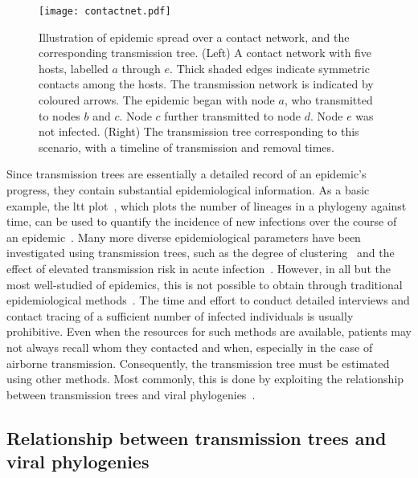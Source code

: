 \begin{figure}
    \centering
    \texttt{[image: contactnet.pdf]}
    \caption[Illustration of a contact network and transmission tree]{
      Illustration of epidemic spread over a contact network, and the
      corresponding transmission tree. (Left) A contact network with five
      hosts, labelled $a$ through $e$. Thick shaded edges indicate symmetric
      contacts among the hosts. The transmission network is indicated by
      coloured arrows. The epidemic began with node $a$, who transmitted to
      nodes $b$ and $c$. Node $c$ further transmitted to node $d$. Node $e$ was
      not infected. (Right) The transmission tree corresponding to this
      scenario, with a timeline of transmission and removal times.
    }
    \label{fig:contactnet}
\end{figure}

Since transmission trees are essentially a detailed record of an epidemic's
progress, they contain substantial epidemiological information. As a basic
example, the \gls{ltt} plot~\autocite{nee1992tempo}, which plots the number of
lineages in a phylogeny against time, can be used to quantify the incidence of
new infections over the course of an epidemic~\autocite{holmes1995revealing}.
Many more diverse epidemiological parameters have been investigated using
transmission trees, such as the degree of
clustering~\autocite{hughes2009molecular} and the effect of elevated
transmission risk in acute infection~\autocite{volz2012simple}. However, in all
but the most well-studied of epidemics, this is not possible to obtain through
traditional epidemiological methods~\autocite{welch2011statistical}. The time
and effort to conduct detailed interviews and contact tracing of a sufficient
number of infected individuals is usually prohibitive. Even when the resources
for such methods are available, patients may not always recall whom they
contacted and when, especially in the case of airborne transmission.
Consequently, the transmission tree must be estimated using other methods. Most
commonly, this is done by exploiting the relationship between transmission
trees and viral phylogenies~\autocite{volz2013viral}.

\subsection{Relationship between transmission trees and viral phylogenies}

